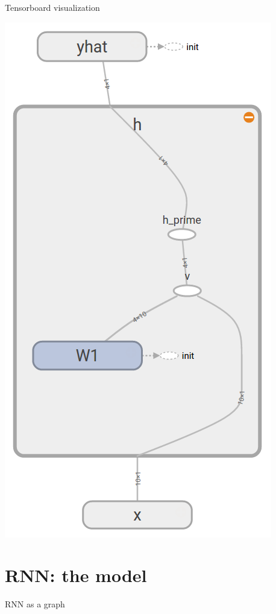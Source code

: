 \documentclass[10pt]{beamer}
\begin{document}
\begin{frame}[fragile]{Tensorboard visualization}
\begin{center}
\includegraphics[scale=0.26]{images/abstract_tf_graph2.png}
\end{center}
\end{frame}


\section{RNN: the model}

\begin{frame}{RNN as a graph}

\end{frame}
\end{document}
